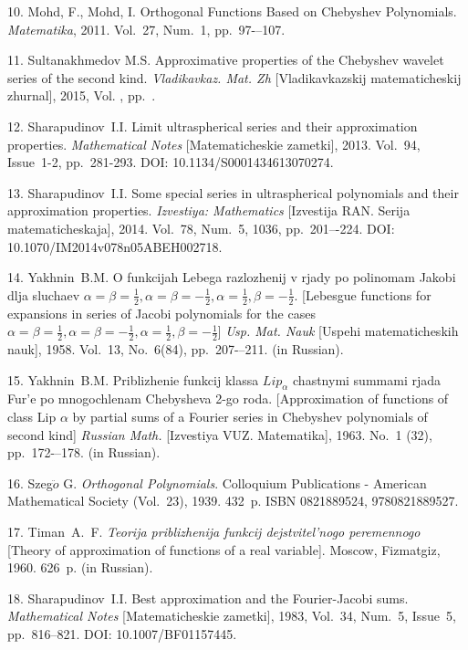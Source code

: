 \documentclass[12pt]{book}
\begin{document}
\begin{Etwocolbib}
10. Mohd, F., Mohd, I. Orthogonal Functions Based on Chebyshev Polynomials. \textit{Matematika}, 2011. Vol.~27, Num.~1, pp.~97-–107.

11. Sultanakhmedov M.S. Approximative properties of the Chebyshev wavelet series of the second kind. \textit{Vladikavkaz. Mat. Zh} [Vladikavkazskij matematicheskij zhurnal], 2015, Vol. , pp.~.

12. Sharapudinov~I.I. Limit ultraspherical series and their approximation properties. \textit{Mathematical Notes} [Matematicheskie zametki], 2013. Vol.~94, Issue~1-2, pp.~281-293. DOI: 10.1134/S0001434613070274.

13. Sharapudinov~I.I. Some special series in ultraspherical polynomials and their approximation properties. \textit{Izvestiya: Mathematics} [Izvestija RAN. Serija matematicheskaja], 2014. Vol.~78, Num.~5, 1036, pp.~201–-224. DOI: 10.1070/IM2014v078n05ABEH002718.

14. Yakhnin~B.M. O funkcijah Lebega razlozhenij v rjady po polinomam Jakobi dlja sluchaev $\alpha=\beta=\frac12, \alpha=\beta=-\frac12, \alpha=\frac12, \beta=-\frac12$. [Lebesgue functions for expansions in series of Jacobi polynomials for the cases $\alpha=\beta=\frac12, \alpha=\beta=-\frac12, \alpha=\frac12, \beta=-\frac12$] \textit{Usp. Mat. Nauk} [Uspehi matematicheskih nauk], 1958. Vol.~13, No.~6(84), pp.~207-–211. (in Russian).

15. Yakhnin~B.M. Priblizhenie funkcij klassa $Lip_\alpha$ chastnymi summami rjada Fur'e po mnogochlenam Chebysheva 2-go roda. [Approximation of functions of class Lip $\alpha $ by partial sums of a Fourier series in Chebyshev polynomials of second kind] \textit{Russian Math.} [Izvestiya VUZ. Matematika], 1963. No.~1 (32), pp.~172-–178.  (in Russian).

16. Szeg$\ddot{o}$ G. \textit{Orthogonal Polynomials}. Colloquium Publications - American Mathematical Society (Vol.~23), 1939. 432~p. ISBN 0821889524, 9780821889527.

17. Timan~A.~F. \textit{Teorija priblizhenija funkcij dejstvitel'nogo peremennogo}
[Theory of approximation of functions of a real variable]. Moscow, Fizmatgiz, 1960. 626~p.  (in Russian).

18. Sharapudinov~I.I. Best approximation and the Fourier-Jacobi sums. \textit{Mathematical Notes} [Matematicheskie zametki], 1983, Vol.~34, Num.~5, Issue~5, pp.~816--821. DOI: 10.1007/BF01157445.


\end{Etwocolbib}%
\end{document}

